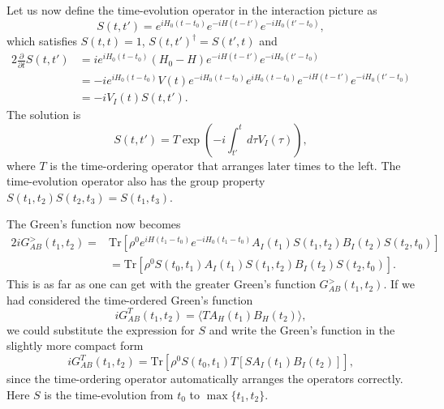 Let us now define the time-evolution operator in the interaction picture as
\begin{equation}
 S(t,t') = e^{iH_0 (t-t_0)} e^{-iH(t-t')}e^{-iH_0 (t'-t_0)},
\end{equation}
which satisfies $S(t,t)=1$, $S(t,t')^{\dagger}=S(t',t)$ and
\begin{alignat}{2}
 \frac{\partial}{\partial t} S(t,t') &= i e^{iH_0(t-t_0)} (H_0-H)  e^{-iH(t-t')}e^{-iH_0 (t'-t_0)} \\
  &=-i e^{iH_0(t-t_0)} V(t) e^{-iH_0(t-t_0)} e^{iH_0(t-t_0)} e^{-iH(t-t')}e^{-iH_0 (t'-t_0)}\\
  &= -i V_I(t) S(t,t').
\end{alignat}
The solution is \cite{dyson,fetter2,bruus}
\begin{equation}
 S(t,t') = T \exp\left( -i\int_{t'}^t d\tau V_I(\tau) \right),
\end{equation}
where $T$ is the time-ordering operator that arranges later times to the left. The time-evolution operator also has the group property $S(t_1,t_2)S(t_2,t_3)=S(t_1,t_3)$.

The Green's function now becomes
\begin{alignat}{2}
 iG^{>}_{AB}(t_1,t_2) = &\textrm{Tr}\left[ \rho^0 e^{iH(t_1-t_0)} e^{-iH_0(t_1-t_0)} A_I(t_1) S(t_1,t_2) B_I(t_2) S(t_2,t_0) \right] \\
  &= \textrm{Tr}\left[\rho^0 S(t_0,t_1) A_I(t_1) S(t_1,t_2) B_I(t_2) S(t_2,t_0)\right].
\end{alignat}
This is as far as one can get with the greater Green's function $G_{AB}^>(t_1,t_2)$. If we had considered the time-ordered Green's function
\begin{equation}
 iG^T_{AB}(t_1,t_2) = \langle T A_H(t_1) B_H(t_2) \rangle,
\end{equation}
we could substitute the expression for $S$ and write the Green's function in the slightly more compact form
\begin{equation}
 iG^T_{AB}(t_1,t_2) = \textrm{Tr} \left[ \rho^0 S(t_0,t_1) T [S A_I(t_1)  B_I(t_2)] \right],
\end{equation}
since the time-ordering operator automatically arranges the operators correctly. Here $S$ is the time-evolution from $t_0$ to $\max\{t_1,t_2\}$.

